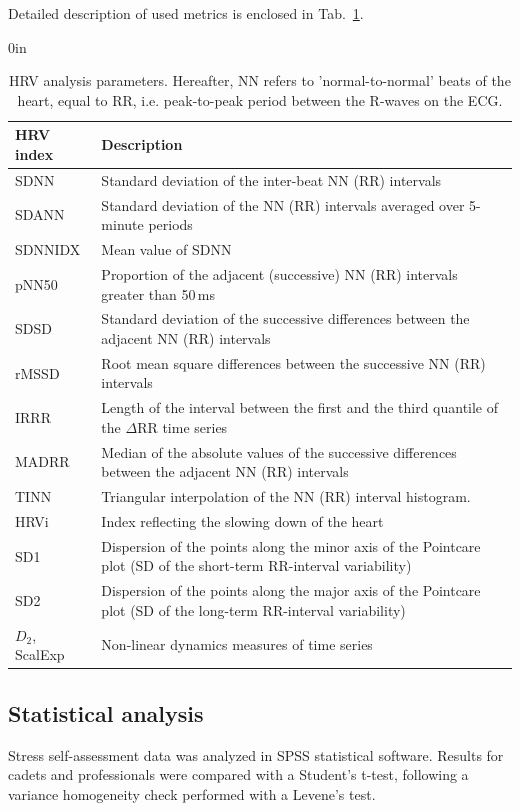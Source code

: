 \documentclass[twocolumn]{bmcart}
\begin{document}
Detailed description of used metrics is enclosed in Tab.~\ref{tab:hrv_ann}.

\begin{table}[ht]
\begin{adjustwidth}{}{0in}
\caption{HRV analysis parameters. Hereafter, NN refers to 'normal-to-normal' beats of the heart, equal to RR, i.e. peak-to-peak period between the R-waves on the ECG.}
\label{tab:hrv_ann}
\begin{tabular}{lp{}}
\hline
HRV index & Description \\
\hline
SDNN & Standard deviation of the inter-beat NN (RR) intervals \\
SDANN & Standard deviation of the NN (RR) intervals averaged over 5-minute periods \\
SDNNIDX & Mean value of SDNN \\
pNN50 & Proportion of the adjacent (successive) NN (RR) intervals greater than 50\,ms \\
SDSD & Standard deviation of the successive differences between the adjacent NN (RR) intervals \\
rMSSD & Root mean square differences between the successive NN (RR) intervals \\
IRRR & Length of the interval between the first and the third quantile of the $\Delta$RR time series \\
MADRR & Median of the absolute values of the successive differences between the adjacent NN (RR) intervals \\
TINN & Triangular interpolation of the NN (RR) interval histogram. \\
HRVi & Index reflecting the slowing down of the heart \\
SD1 & Dispersion of the points along the minor axis of the Pointcare plot (SD of the short-term RR-interval variability) \\
SD2 & Dispersion of the points along the major axis of the Pointcare plot (SD of the long-term RR-interval variability)\\
$D_2$, ScalExp & Non-linear dynamics measures of time series \\
\hline
\end{tabular}
\end{adjustwidth}
\end{table}

\subsection{Statistical analysis}
Stress self-assessment data was analyzed in SPSS statistical software. Results for cadets and professionals were compared with a Student's t-test, following a variance homogeneity check performed with a Levene's test.
\end{document}
